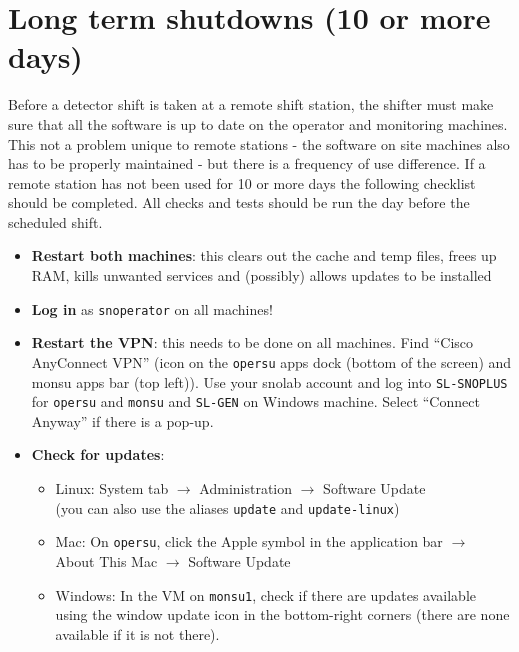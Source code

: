 \documentclass[12pt, oneside, a4paper]{article}
\begin{document}
\section{Long term shutdowns (10 or more days)}
Before a detector shift is taken at a remote shift station, the shifter must make sure that all the software is up to date on the operator and monitoring machines. This not a problem unique to remote stations - the software on site machines also has to be properly maintained - but there is a frequency of use difference. If a remote station has not been used for 10 or more days the following checklist should be completed. All checks and tests should be run the day before the scheduled shift.
\begin{itemize}
	\item \textbf{Restart both machines}: this clears out the cache and temp files, frees up RAM, kills unwanted services and (possibly) allows updates to be installed
	\item \textbf{Log in} as {\tt snoperator} on all machines!
	\item \textbf{Restart the VPN}: this needs to be done on all machines. Find ``Cisco AnyConnect VPN'' (icon on the {\tt opersu} apps dock (bottom of the screen) and monsu apps bar (top left)). Use your snolab account and log into {\tt SL-SNOPLUS} for {\tt opersu} and {\tt monsu} and {\tt SL-GEN} on Windows machine. Select ``Connect Anyway'' if there is a pop-up.
	\item \textbf{Check for updates}:
	\begin{itemize}
		\item Linux: System tab $\rightarrow$ Administration $\rightarrow$ Software Update \\
		      (you can also use the aliases {\tt update} and {\tt update-linux})
		\item Mac: On {\tt opersu}, click the Apple symbol in the application bar $\rightarrow$ About This Mac $\rightarrow$ Software Update 
		\item Windows: In the VM on {\tt monsu1}, check if there are updates available using the window update icon in the bottom-right corners (there are none available if it is not there).
	\end{itemize}
\end{itemize}
\end{document}
